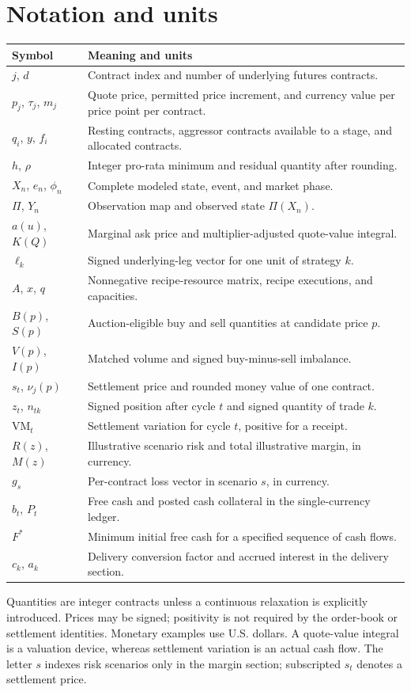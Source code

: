 \section*{Notation and units}
\begin{tabularx}{\textwidth}{@{}lX@{}}
\toprule
Symbol & Meaning and units\\
\midrule
$j$, $d$ & Contract index and number of underlying futures contracts.\\
$p_j$, $\tau_j$, $m_j$ & Quote price, permitted price increment, and currency value per price point per contract.\\
$q_i$, $y$, $f_i$ & Resting contracts, aggressor contracts available to a stage, and allocated contracts.\\
$h$, $\rho$ & Integer pro-rata minimum and residual quantity after rounding.\\
$X_n$, $e_n$, $\phi_n$ & Complete modeled state, event, and market phase.\\
$\Pi$, $Y_n$ & Observation map and observed state $\Pi(X_n)$.\\
$a(u)$, $K(Q)$ & Marginal ask price and multiplier-adjusted quote-value integral.\\
$\ell_k$ & Signed underlying-leg vector for one unit of strategy $k$.\\
$A$, $x$, $q$ & Nonnegative recipe-resource matrix, recipe executions, and capacities.\\
$B(p)$, $S(p)$ & Auction-eligible buy and sell quantities at candidate price $p$.\\
$V(p)$, $I(p)$ & Matched volume and signed buy-minus-sell imbalance.\\
$s_t$, $\nu_j(p)$ & Settlement price and rounded money value of one contract.\\
$z_t$, $n_{tk}$ & Signed position after cycle $t$ and signed quantity of trade $k$.\\
$\mathrm{VM}_t$ & Settlement variation for cycle $t$, positive for a receipt.\\
$R(z)$, $M(z)$ & Illustrative scenario risk and total illustrative margin, in currency.\\
$g_s$ & Per-contract loss vector in scenario $s$, in currency.\\
$b_t$, $P_t$ & Free cash and posted cash collateral in the single-currency ledger.\\
$F^*$ & Minimum initial free cash for a specified sequence of cash flows.\\
$c_k$, $a_k$ & Delivery conversion factor and accrued interest in the delivery section.\\
\bottomrule
\end{tabularx}

\medskip
Quantities are integer contracts unless a continuous relaxation is explicitly introduced. Prices may be signed; positivity is not required by the order-book or settlement identities. Monetary examples use U.S. dollars. A quote-value integral is a valuation device, whereas settlement variation is an actual cash flow. The letter $s$ indexes risk scenarios only in the margin section; subscripted $s_t$ denotes a settlement price.
